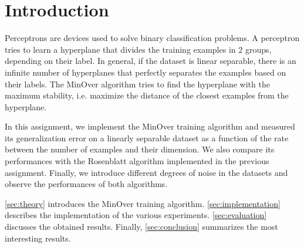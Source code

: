\section{Introduction}
\label{sec:introduction}

Perceptrons are devices used to solve binary classification problems.
A perceptron tries to learn a hyperplane that divides the training examples in $2$ groups, depending on their label.
In general, if the dataset is linear separable, there is an infinite number of hyperplanes that perfectly separates the examples based on their labels.
The MinOver algorithm \cite{minover} tries to find the hyperplane with the maximum stability, i.e. maximize the distance of the closest examples from the hyperplane.

In this assignment, we implement the MinOver training algorithm and measured its generalization error on a linearly separable dataset as a function of the rate between
the number of examples and their dimension.
We also compare its performances with the Rosenblatt algorithm \cite{rosenblatt} implemented in the previous assignment.
Finally, we introduce different degrees of noise in the datasets and observe the performances of both algorithms.

\cref{sec:theory} introduces the MinOver training algorithm.
\cref{sec:implementation} describes the implementation of the various experiments.
\cref{sec:evaluation} discusses the obtained results.
Finally, \cref{sec:conclusion} summarizes the most interesting results.
